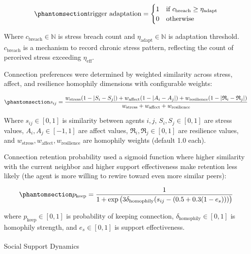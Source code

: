 \documentclass[
  letterpaper,
  DIV=11,
  numbers=noendperiod]{scrartcl}
\makeatletter
\let\oldparagraph\paragraph
\renewcommand{\paragraph}{
    \@ifstar
      \xxxParagraphStar
      \xxxParagraphNoStar
  }
\newcommand{\xxxParagraphStar}[1]{\oldparagraph*{#1}\mbox{}}
\newcommand{\xxxParagraphNoStar}[1]{\oldparagraph{#1}\mbox{}}
\makeatother
\begin{document}
\begin{equation}\phantomsection\label{eq-adaptation-trigger}{
\mathrm{trigger\ adaptation} = \begin{cases}
1 & \text{if } c_{\text{breach}} \geq \eta_{\text{adapt}} \\
0 & \text{otherwise}
\end{cases}
}\end{equation}

Where \(c_{\text{breach}} \in \mathbb{N}\) is stress breach count and
\(\eta_{\text{adapt}} \in \mathbb{N}\) is adaptation threshold.
\(c_{\text{breach}}\) is a mechanism to record chronic stress pattern,
reflecting the count of perceived stress exceeding
\(\eta_{\mathrm{eff}}\).

Connection preferences were determined by weighted similarity across
stress, affect, and resilience homophily dimensions with configurable
weights:

\begin{equation}\phantomsection\label{eq-connection-similarity}{
s_{ij} = \frac{w_{\mathrm{stress}}(1 - |S_i - S_j|) + w_{\mathrm{affect}}(1 - |A_i - A_j|) + w_{\mathrm{resilience}}(1 - |\mathfrak{R}_i - \mathfrak{R}_j|)}{w_{\mathrm{stress}} + w_{\mathrm{affect}} + w_{\mathrm{resilience}}}
}\end{equation}

Where \(s_{ij} \in [0,1]\) is similarity between agents \(i,j\),
\(S_i, S_j \in [0,1]\) are stress values, \(A_i, A_j \in [-1,1]\) are
affect values, \(\mathfrak{R}_i, \mathfrak{R}_j \in [0,1]\) are
resilience values, and
\(w_{\mathrm{stress}}, w_{\mathrm{affect}}, w_{\mathrm{resilience}}\)
are homophily weights (default 1.0 each).

Connection retention probability used a sigmoid function where higher
similarity with the current neighbor and higher support effectiveness
make retention less likely (the agent is more willing to rewire toward
even more similar peers):

\begin{equation}\phantomsection\label{eq-retention-probability}{
p_{\text{keep}} = \frac{1}{1 + \exp\big(3 \delta_{\text{homophily}} (s_{ij} - (0.5 + 0.3(1 - e_s)))\big)}
}\end{equation}

where \(p_{\text{keep}} \in [0,1]\) is probability of keeping
connection, \(\delta_{\text{homophily}} \in [0,1]\) is homophily
strength, and \(e_s \in [0,1]\) is support effectiveness.

\paragraph{Social Support Dynamics}\label{social-support-dynamics}
\end{document}
